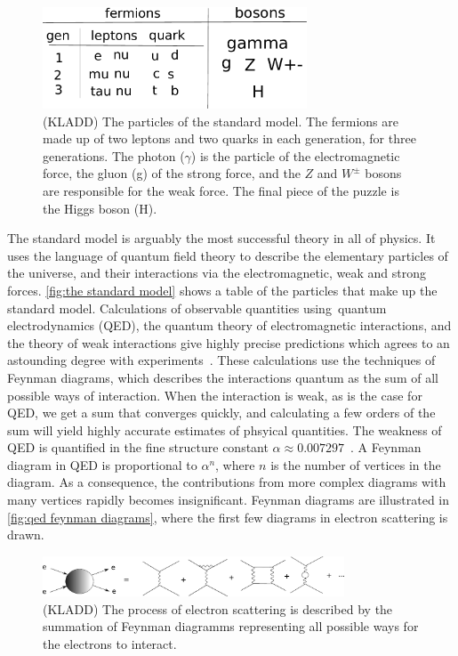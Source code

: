 \begin{figure}[h]
    \centering
    \includegraphics[width=0.7\textwidth]{figurer/standard_model.pdf}
    \caption{(KLADD) The particles of the standard model. The fermions are made up of two leptons and two quarks in each generation, for three generations. The photon ($\gamma$) is the particle of the electromagnetic force, the gluon (g) of the strong force, and the $Z$ and $W^\pm$ bosons are responsible for the weak force. The final piece of the puzzle is the Higgs boson (H).}
    \label{fig:the standard model}
\end{figure}

The standard model is arguably the most successful theory in all of physics.
It uses the language of quantum field theory to describe the elementary particles of the universe, and their interactions via the electromagnetic, weak and strong forces.
\autoref{fig:the standard model} shows a table of the particles that make up the standard model.
Calculations of observable quantities using quantum electrodynamics (QED), the quantum theory of electromagnetic interactions, and the theory of weak interactions give highly precise predictions which agrees to an astounding degree with experiments~\cite{Schwartz:QFT}.
These calculations use the techniques of Feynman diagrams, which describes the interactions quantum as the sum of all possible ways of interaction.
When the interaction is weak, as is the case for QED, we get a sum that converges quickly, and calculating a few orders of the sum will yield highly accurate estimates of phsyical quantities.
The weakness of QED is quantified in the fine structure constant $\alpha \approx 0.00 7297$~\cite{PDG}.
A Feynman diagram in QED is proportional to $\alpha^n$, where $n$ is the number of vertices in the diagram.
As a consequence, the contributions from more complex diagrams with many vertices rapidly becomes insignificant.
Feynman diagrams are illustrated in \autoref{fig:qed feynman diagrams}, where the first few diagrams in electron scattering is drawn.

\begin{figure}
    \centering
    \includegraphics[width=0.8\textwidth]{figurer/electron_scattering.pdf}
    \caption{(KLADD) The process of electron scattering is described by the summation of Feynman diagramms representing all possible ways for the electrons to interact. }
    \label{fig:qed feynman diagrams}
\end{figure}

